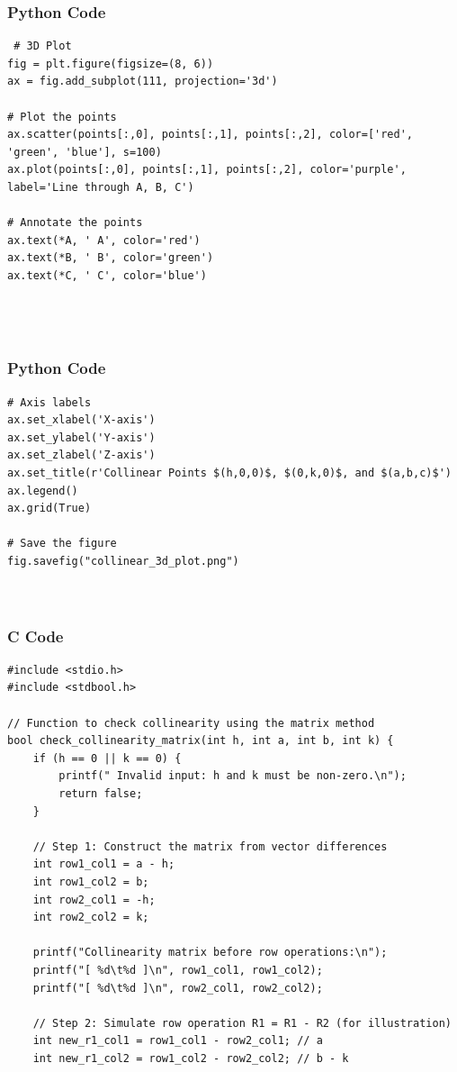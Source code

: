 \documentclass{beamer}
\begin{document}
\begin{frame}[fragile]
    \frametitle{Python Code}

    \begin{lstlisting}
 # 3D Plot
fig = plt.figure(figsize=(8, 6))
ax = fig.add_subplot(111, projection='3d')

# Plot the points
ax.scatter(points[:,0], points[:,1], points[:,2], color=['red', 'green', 'blue'], s=100)
ax.plot(points[:,0], points[:,1], points[:,2], color='purple', label='Line through A, B, C')

# Annotate the points
ax.text(*A, ' A', color='red')
ax.text(*B, ' B', color='green')
ax.text(*C, ' C', color='blue')




    \end{lstlisting}
\end{frame}

\begin{frame}[fragile]
    \frametitle{Python Code}

    \begin{lstlisting}
# Axis labels
ax.set_xlabel('X-axis')
ax.set_ylabel('Y-axis')
ax.set_zlabel('Z-axis')
ax.set_title(r'Collinear Points $(h,0,0)$, $(0,k,0)$, and $(a,b,c)$')
ax.legend()
ax.grid(True)

# Save the figure
fig.savefig("collinear_3d_plot.png")



\end{lstlisting}
\end{frame}

 



 


\begin{frame}[fragile]
\frametitle{C Code}
\begin{lstlisting}
#include <stdio.h>
#include <stdbool.h>

// Function to check collinearity using the matrix method
bool check_collinearity_matrix(int h, int a, int b, int k) {
    if (h == 0 || k == 0) {
        printf(" Invalid input: h and k must be non-zero.\n");
        return false;
    }

    // Step 1: Construct the matrix from vector differences
    int row1_col1 = a - h;
    int row1_col2 = b;
    int row2_col1 = -h;
    int row2_col2 = k;

    printf("Collinearity matrix before row operations:\n");
    printf("[ %d\t%d ]\n", row1_col1, row1_col2);
    printf("[ %d\t%d ]\n", row2_col1, row2_col2);

    // Step 2: Simulate row operation R1 = R1 - R2 (for illustration)
    int new_r1_col1 = row1_col1 - row2_col1; // a
    int new_r1_col2 = row1_col2 - row2_col2; // b - k
    \end{lstlisting}

\end{frame}
\end{document}
